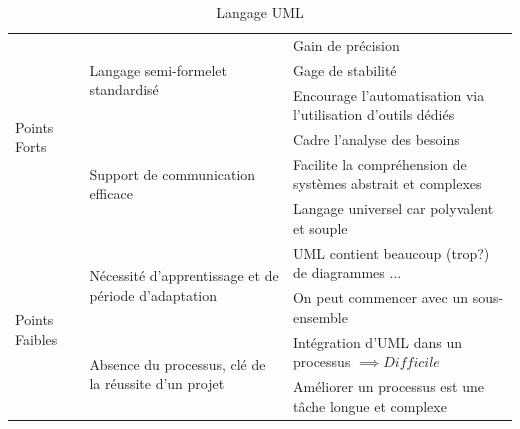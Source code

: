 \begin{table}[H]
	\centering
		\caption{Langage UML}
		\label{tbl:modélisation}
		\begin{adjustbox}{max width=\textwidth}
		\begin{tabular}{l|l|l}
			\toprule
			\multirow{6}{*}{Points Forts}&\multirow{3}{*}{Langage \og semi-formel\fg et standardisé}		&  Gain de précision\\
			\cmidrule(lr){3-3}
            & & Gage de stabilité\\
            \cmidrule(lr){3-3}
            & & Encourage l’automatisation via l’utilisation d’outils dédiés\\
            \cmidrule(lr){2-2}\cmidrule(lr){3-3}
            &\multirow{3}{*}{Support de communication efficace}
			&  Cadre l'analyse des besoins\\
			\cmidrule(lr){3-3}
            & & Facilite la compréhension de systèmes abstrait et complexes\\
            \cmidrule(lr){3-3}
            & & Langage universel car polyvalent et souple\\
            \cmidrule{1-2} \cmidrule(lr){3-3}
			\multirow{4}{*}{Points Faibles}& \multirow{2}{*}{Nécessité d'apprentissage et de période d’adaptation} 
			& UML contient beaucoup (trop?) de diagrammes ...  \\
			\cmidrule(lr){3-3}
			&& On peut commencer avec un sous-ensemble \\
			\cmidrule(lr){2-2}\cmidrule(lr){3-3}
			&\multirow{2}{*}{Absence du processus, clé de la réussite d’un projet}
			& Intégration d'UML dans un processus $\implies Difficile$\\
			\cmidrule(lr){3-3}
			&& Améliorer un processus est une tâche longue et complexe\\
			\bottomrule
		\end{tabular}
		\end{adjustbox}
\end{table}

